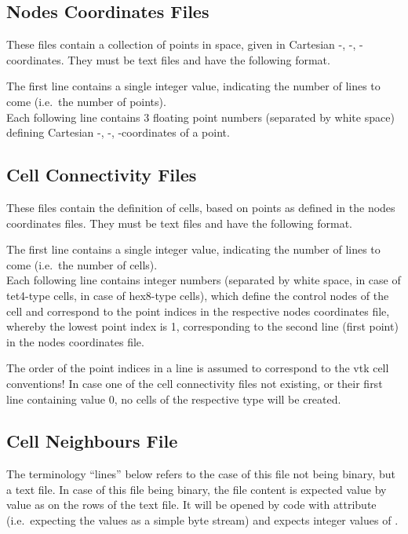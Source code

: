 \subsection{Nodes Coordinates Files}
These files contain a collection of points in space, given in Cartesian -, -, 
-coordinates. They must be text files and have the following format.

The first line contains a single integer value, indicating the number of lines to come (i.e.\ the 
number of points).\\
Each following line contains 3 floating point numbers (separated by white space) defining Cartesian 
-, -, -coordinates of a point.

\subsection{Cell Connectivity Files}
These files contain the definition of cells, based on points as defined in the nodes coordinates files.
They must be text files and have the following format.

The first line contains a single integer value, indicating the number of lines to come (i.e.\ the 
number of cells).\\
Each following line contains  integer numbers (separated by white space,  
in case of tet4-type cells,  in case of hex8-type cells), which define the control nodes 
of the cell and correspond to the point indices in the respective nodes coordinates file, whereby the 
lowest point index is 1, corresponding to the second line (first point) in the nodes coordinates file.

The order of the point indices in a line is assumed to correspond to the vtk cell conventions!
In case one of the cell connectivity files not existing, or their first line containing value 0, no cells
of the respective type will be created.

\subsection{Cell Neighbours File}
The terminology ``lines'' below refers to the case of this file not being binary, but a text file. 
In case of this file being binary, the file content is expected value by value as on the rows of the
text file. It will be opened by  code with attribute 
(i.e.\ expecting the values as a simple byte stream) and expects integer values of .

